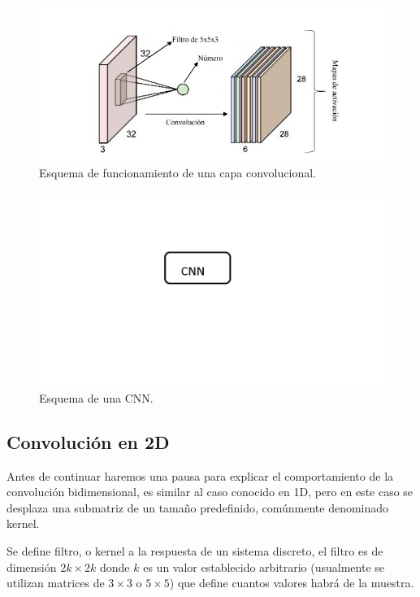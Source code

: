 \begin{figure}
    \centering
    \includegraphics[width=1\textwidth]{imgs/capa-convolucional.jpeg}
    \caption{Esquema de funcionamiento de una capa convolucional.}
    \label{fig:esquema-capa-convolucional}
\end{figure}
\begin{figure}
    \centering
    \includegraphics[width=1\textwidth]{imgs/CNN-completa.jpg}
    \caption{Esquema de una CNN.}
    \label{fig:esquema-CNN}
\end{figure}

\subsection{Convolución en 2D}

Antes de continuar haremos una pausa para explicar el comportamiento de la convolución bidimensional, es similar al caso conocido en 1D, pero
en este caso se desplaza una submatriz de un tamaño predefinido, comúnmente denominado kernel.

Se define filtro, o kernel a la respuesta de un sistema discreto, el filtro es de dimensión $2k \times 2k$ donde $k$ es un
valor establecido arbitrario (usualmente se utilizan matrices de $3 \times 3$ o $5 \times 5$) que define cuantos valores habrá de la muestra.

